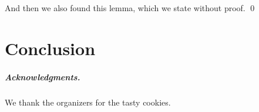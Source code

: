 \documentclass[a4paper,english,numberwithinsect]{eurocg19-submission}
\begin{document}
\begin{lemma}
  And then we also found this lemma, which we state without proof.
  \qed
\end{lemma}

\section{Conclusion}

\subparagraph*{Acknowledgments.} We thank the organizers for
the tasty cookies.


\end{document}
